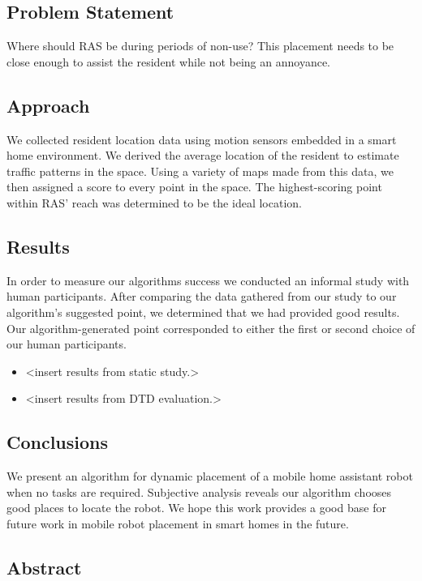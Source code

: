 \documentclass[11pt, conference, a4paper]{IEEEtran}
\begin{document}
\subsection{Problem Statement}
Where should RAS be during periods of non-use? This placement needs to be close enough to assist the resident while not being an annoyance. 


\subsection{Approach}
We collected resident location data using motion sensors embedded in a smart home environment. We derived the average location of the resident to estimate traffic patterns in the space. Using a variety of maps made from this data, we then assigned a score to every point in the space. The highest-scoring point within RAS' reach was determined to be the ideal location.


\subsection{Results}
In order to measure our algorithms success we conducted an informal study with human participants. After comparing the data gathered from our study to our algorithm's suggested point, we determined that we had provided good results. Our algorithm-generated point corresponded to either the first or second choice of our human participants.
\begin{itemize}
    \item \textless insert results from static study.\textgreater 
    \item \textless insert results from DTD evaluation.\textgreater
\end{itemize}



\subsection{Conclusions}
We present an algorithm for dynamic placement of a mobile home assistant robot 
when no tasks are required. Subjective analysis reveals our algorithm chooses 
good places to locate the robot. We hope this work provides a good base for 
future work in mobile robot placement in smart homes in the future.


\subsection{Abstract}
\end{document}
